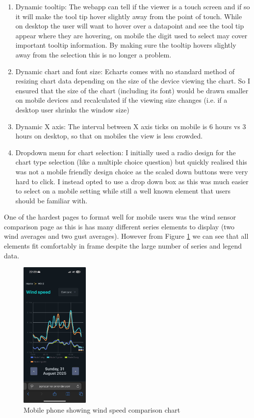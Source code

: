 \begin{enumerate}
    \item Dynamic tooltip: The webapp can tell if the viewer is a touch screen and
          if so it will make the tool tip hover slightly away from the point of
          touch. While on desktop the user will want to hover over a datapoint and
          see the tool tip appear where they are hovering, on mobile the digit
          used to select may cover important tooltip information. By making sure
          the tooltip hovers slightly away from the selection this is no longer a
          problem.
    \item Dynamic chart and font size: Echarts comes with no standard method of
          resizing chart data depending on the size of the device viewing the
          chart. So I ensured that the size of the chart (including its font)
          would be drawn smaller on mobile devices and recalculated if the viewing
          size changes (i.e. if a desktop user shrinks the window size)
    \item Dynamic X axis: The interval between X axis ticks on mobile is 6 hours
          vs 3 hours on desktop, so that on mobiles the view is less crowded.
    \item Dropdown menu for chart selection: I initially used a radio design for
          the chart type selection (like a multiple choice question) but quickly
          realised this was not a mobile friendly design choice as the scaled down
          buttons were very hard to click. I instead opted to use a drop down box
          as this was much easier to select on a mobile setting while still a well
          known element that users should be familiar with.
\end{enumerate}

One of the hardest pages to format well for mobile users was the wind sensor
comparison page as this is has many different series elements to display (two
wind averages and two gust averages). However from Figure \ref{fig:mobile-page}
we can see that all elements fit comfortably in frame despite the large number
of series and legend data.

\begin{figure}[H]
    \centering
    \includegraphics[width=0.3\textwidth]{contents/part-3/fig3/mobile-wind-speed-compare.jpeg}
    \caption{Mobile phone showing wind speed comparison chart}
    \label{fig:mobile-page}
\end{figure}


